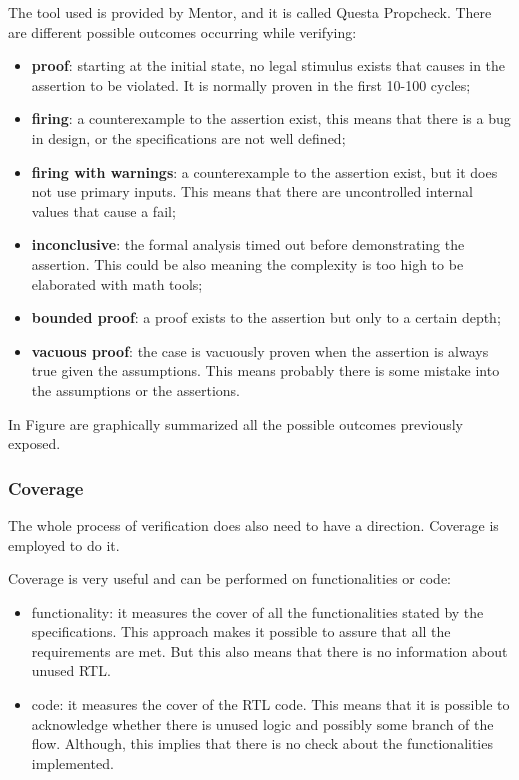 The tool used is provided by Mentor, and it is called Questa Propcheck.
There are different possible outcomes occurring while verifying:
\begin{itemize}
    \item \textbf{proof}: starting at the initial state, no legal stimulus exists that causes in the assertion to be violated. It is normally proven in the first 10-100 cycles;
    
    \item \textbf{firing}: a counterexample to the assertion exist, this means that there is a bug in design, or the specifications are not well defined;
    
    \item \textbf{firing with warnings}: a counterexample to the assertion exist, but it does not use primary inputs. This means that there are uncontrolled internal values that cause a fail;
    
    \item \textbf{inconclusive}: the formal analysis timed out before demonstrating the assertion. This could be also meaning the complexity is too high to be elaborated with math tools; 
    
    \item \textbf{bounded proof}: a proof exists to the assertion but only to a certain depth;
    
    \item \textbf{vacuous proof}: the case is vacuously proven when the assertion is always true given the assumptions. This means probably there is some mistake into the assumptions or the assertions.
\end{itemize}

In Figure %
are graphically summarized all the possible outcomes previously exposed.





\subsubsection{Coverage}
The whole process of verification does also need to have a direction. Coverage is employed to do it.

Coverage is very useful and can be performed on functionalities or code:
\begin{itemize}
    \item functionality: it measures the cover of all the functionalities stated by the specifications. This approach makes it possible to assure that all the requirements are met. But this also means that there is no information about unused RTL.
    
    \item code: it measures the cover of the RTL code. This means that it is possible to acknowledge whether there is unused logic and possibly some branch of the flow. Although, this implies that there is no check about the functionalities implemented.

\end{itemize}

